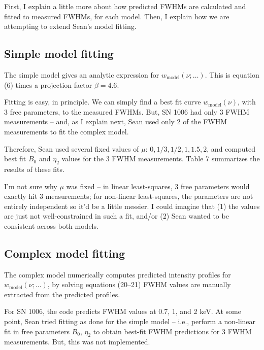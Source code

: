 \documentclass[10pt]{article}
\newcommand{\mt}{\mathrm}
\begin{document}
First, I explain a little more about how predicted FWHMs are calculated and
fitted to measured FWHMs, for each model.
Then, I explain how we are attempting to extend Sean's model fitting.

\subsection{Simple model fitting}

The simple model gives an analytic expression for $w_{\mt{model}}(\nu;\ldots)$.
This is equation (6) times a projection factor $\beta = 4.6$.

Fitting is easy, in principle.  We can simply find a best fit curve
$w_{\mt{model}}(\nu)$, with 3 free parameters, to the measured FWHMs.
But, SN 1006 had only 3 FWHM measurements -- and, as I explain next, Sean used
only 2 of the FWHM measurements to fit the complex model.

Therefore, Sean used several fixed values of $\mu$: $0, 1/3, 1/2, 1, 1.5, 2$,
and computed best fit $B_0$ and $\eta_2$ values for the 3 FWHM measurements.
Table 7 summarizes the results of these fits.

I'm not sure why $\mu$ was fixed -- in linear least-squares, 3 free parameters
would exactly hit 3 measurements; for non-linear least-squares, the parameters
are not entirely independent so it'd be a little messier.  I could imagine that
(1) the values are just not well-constrained in such a fit, and/or
(2) Sean wanted to be consistent across both models.

\subsection{Complex model fitting}

The complex model numerically computes predicted intensity profiles
for $w_{\mt{model}}(\nu; \ldots)$, by solving equations (20--21)
FWHM values are manually extracted from the predicted profiles.

For SN 1006, the code predicts FWHM values at 0.7, 1, and 2 keV.  At some
point, Sean tried fitting as done for the simple model -- i.e., perform a
non-linear fit in free parameters $B_0$, $\eta_2$ to obtain best-fit
FWHM predictions for 3 FWHM measurements.  But, this was not implemented.
\end{document}
